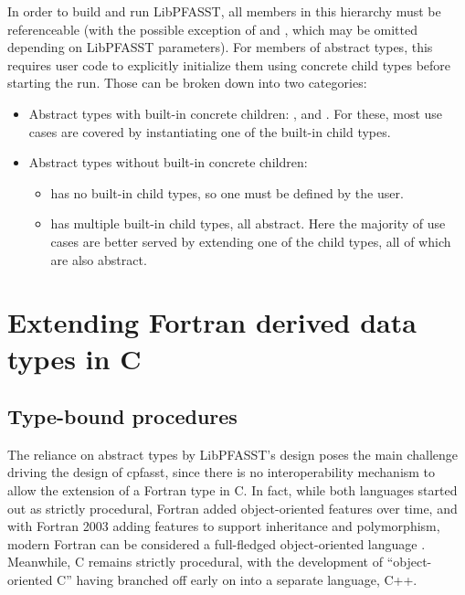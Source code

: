 In order to build and run LibPFASST, all members in this hierarchy must be referenceable (with the possible exception of  and , which may be omitted depending on LibPFASST parameters). For members of abstract types, this requires user code to explicitly initialize them using concrete child types before starting the run. Those can be broken down into two categories:
\begin{itemize}
    \item Abstract types with built-in concrete children: ,  and . For these, most use cases are covered by instantiating one of the built-in child types.
    \item Abstract types without built-in concrete children:
        \begin{itemize}
        \item {} has no built-in child types, so one must be defined by the user.
        \item {} has multiple built-in child types, all abstract. Here the majority of use cases are better served by extending one of the child types, all of which are also abstract.
    \end{itemize}
\end{itemize}



\section{Extending Fortran derived data types in C} \label{sec:impl_oop}


\subsection{Type-bound procedures} \label{sec:impl_functions}

The reliance on abstract types by LibPFASST's design poses the main challenge driving the design of cpfasst, since there is no interoperability mechanism to allow the extension of a Fortran type in C. In fact, while both languages started out as strictly procedural, Fortran added object-oriented features over time, and with Fortran 2003 adding features to support inheritance and polymorphism, modern Fortran can be considered a full-fledged object-oriented language \cite{clerman2011modern}. Meanwhile, C remains strictly procedural, with the development of ``object-oriented C'' having branched off early on into a separate language, C++.

